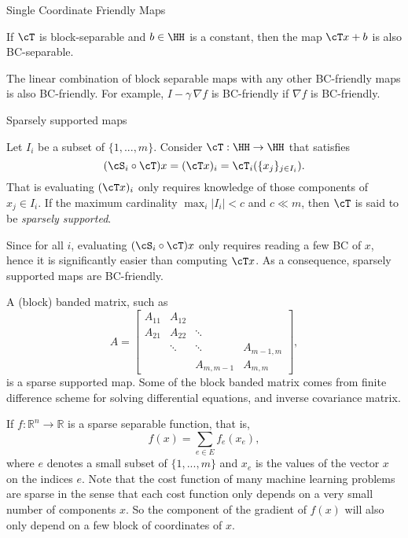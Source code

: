 \begin{section}{Single Coordinate Friendly Maps}
\begin{example}
If $\cT$ is block-separable and $b \in \HH$ is a constant, then the map $\cT x + b$ is also BC-separable. 
\end{example}

\begin{example}
The linear combination of block separable maps with any other BC-friendly maps is also BC-friendly. For example, $I - \gamma \, \nabla f$ is BC-friendly if $\nabla f$ is BC-friendly. 
\end{example}


\begin{subsection}{Sparsely supported maps}
\begin{definition}
Let $I_i$ be a subset of $\{1, ..., m\}$. Consider $\cT: \HH \rightarrow \HH$ that satisfies
\begin{equation}
(\cS_i \circ \cT) x = (\cT x)_i = \cT_i(\{x_j\}_{j\in I_i}).
\end{equation}
That is evaluating $(\cT x)_i$ only requires knowledge of those components of $x_j \in I_i$. If the maximum cardinality $\max_{i} |I_i| < c$ and $c \ll m$, then $\cT$ is said to be \emph{sparsely supported}. 
\end{definition}
Since for all $i$, evaluating $(\cS_i \circ \cT) x$ only requires reading a few BC of $x$, hence it is significantly easier than computing $\cT x$. As a consequence, sparsely supported maps are BC-friendly. 

\begin{example}
A (block) banded matrix, such as
$$A = \begin{bmatrix}A_{11} & A_{12} & \\ A_{21}& A_{22} & \ddots \\ & \ddots & \ddots & A_{m-1,m}\\&  & A_{m,m-1} & A_{m,m}\end{bmatrix},$$
is a sparse supported map. Some of the block banded matrix comes from finite difference scheme for solving differential equations, and inverse covariance matrix. 
\end{example}

\begin{example}
If $f: \mathbb{R}^n \rightarrow \mathbb{R}$ is a sparse separable function, that is,
$$f(x) = \sum_{e \in E} f_e (x_e),$$
where $e$ denotes a small subset of $\{1, ..., m\}$ and $x_e$ is the values of the vector $x$ on the indices $e$. Note that the cost function of many machine learning problems are sparse in the sense that each cost function only depends on a very small number of components $x$. So the component of the gradient of $f(x)$ will also only depend on a few block of coordinates of $x$.
\end{example}


\end{subsection}
\end{section}
